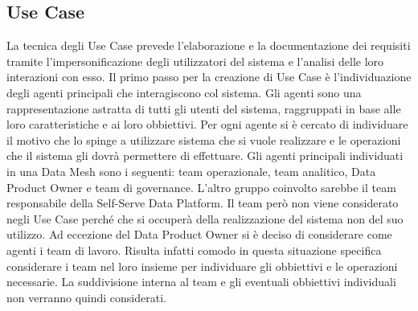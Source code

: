 \documentclass[12pt]{report}
\begin{document}
\subsection{Use Case}
La tecnica degli Use Case prevede l'elaborazione e la documentazione dei requisiti tramite l'impersonificazione degli utilizzatori del sistema e l'analisi delle loro interazioni con esso. 
Il primo passo per la creazione di Use Case è l'individuazione degli agenti principali che interagiscono col sistema.
Gli agenti sono una rappresentazione astratta di tutti gli utenti del sistema, raggruppati in base alle loro caratteristiche e ai loro obbiettivi. 
Per ogni agente si è cercato di individuare il motivo che lo spinge a utilizzare sistema che si vuole realizzare e le operazioni che il sistema gli dovrà permettere di effettuare. 
Gli agenti principali individuati in una Data Mesh sono i seguenti: team operazionale, team analitico, Data Product Owner e team di governance.
L'altro gruppo coinvolto sarebbe il team responsabile della Self-Serve Data Platform.
Il team però non viene considerato negli Use Case perché che si occuperà della realizzazione del sistema non del suo utilizzo. 
Ad eccezione del Data Product Owner si è deciso di considerare come agenti i team di lavoro.
Risulta infatti comodo in questa situazione specifica considerare i team nel loro insieme per individuare gli obbiettivi e le operazioni necessarie. 
La suddivisione interna al team e gli eventuali obbiettivi individuali non verranno quindi considerati.
\end{document}
